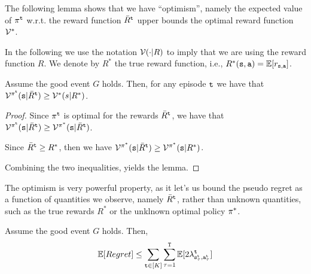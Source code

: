 The following lemma shows that we have ``optimism'', namely the expected value of $\pi^{\tt t}$ w.r.t. the reward function $\bar{R}^{\tt t}$ upper bounds the optimal reward function $\mathcal{V}^*$.

In the following we use the notation $\mathcal{V}(\cdot|R)$ to imply that we are using the reward function $R$. We denote by $R^*$ the true reward function, i.e., $R^*({\tt s},{\tt a})=\mathbb{E}[r_{{\tt s},{\tt a}}]$.

\begin{lemma}
    Assume the good event $G$ holds. Then, for any episode ${\tt t}$ we have that $\mathcal{V}^{\pi^{\tt t}}({\tt s} | \bar{R}^{\tt t})\geq \mathcal{V}^*(s|R^*)$.
\end{lemma}

\begin{proof}
    Since $\pi^{\tt t}$ is optimal for the rewards $\bar{R}^{\tt t}$, we have that $\mathcal{V}^{\pi^{\tt t}}({\tt s} | \bar{R}^{\tt t})\geq \mathcal{V}^{\pi^*}({\tt s} | \bar{R}^{\tt t})$.

Since $\bar{R}^{\tt t}\geq R^*$, then we have
$\mathcal{V}^{\pi^*}({\tt s} | \bar{R}^{\tt t})\geq \mathcal{V}^{\pi^*}({\tt s} | R^*)$.

Combining the two inequalities, yields the lemma.
\end{proof}

The optimism is very powerful property, as it let's us bound the pseudo regret as a function of quantities we observe, namely $\bar{R}^{\tt t}$, rather than unknown quantities, such as the true rewards $R^*$ or the unklnown optimal policy $\pi^*$.

\begin{lemma}
\label{MAB:lemma:UCB-RL:optimism}
Assume the good event $G$ holds. Then,
    \[
    \mathbb{E}[Regret] \leq \sum_{{\tt t}\in [K]} \sum_{\tau=1}^{\tt T}
    \mathbb{E}[2\lambda^{\tt t}_{{\tt s}^{\tt t}_\tau,{\tt a}^{\tt t}_\tau}]
    \]
\end{lemma}

